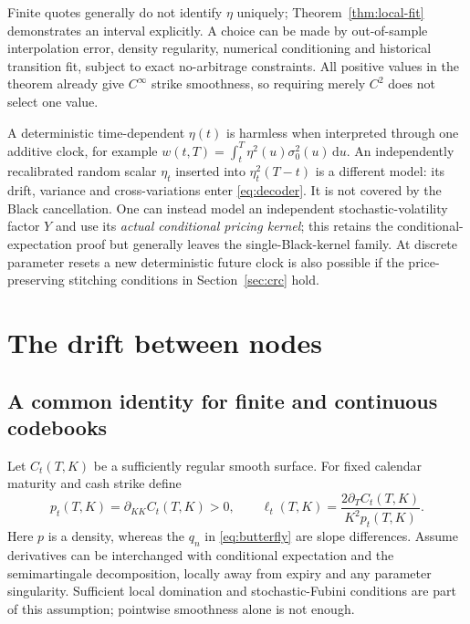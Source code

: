 \documentclass[11pt,a4paper]{article}
\numberwithin{equation}{section}
\theoremstyle{definition}\newtheorem{definition}[theorem]{Definition}
\theoremstyle{remark}\newtheorem{remark}[theorem]{Remark}
\newcommand{\dd}{\,\mathrm d}\newcommand{\dt}{\,\mathrm dt}
\begin{document}
Finite quotes generally do not identify $\eta$ uniquely; Theorem~\ref{thm:local-fit} demonstrates an interval explicitly. A choice can be made by out-of-sample interpolation error, density regularity, numerical conditioning and historical transition fit, subject to exact no-arbitrage constraints. All positive values in the theorem already give $C^\infty$ strike smoothness, so requiring merely $C^2$ does not select one value.

A deterministic time-dependent $\eta(t)$ is harmless when interpreted through one additive clock, for example $w(t,T)=\int_t^T\eta^2(u)\sigma_0^2(u)\dd u$. An independently recalibrated random scalar $\eta_t$ inserted into $\eta_t^2(T-t)$ is a different model: its drift, variance and cross-variations enter \eqref{eq:decoder}. It is not covered by the Black cancellation. One can instead model an independent stochastic-volatility factor $Y$ and use its \emph{actual conditional pricing kernel}; this retains the conditional-expectation proof but generally leaves the single-Black-kernel family. At discrete parameter resets a new deterministic future clock is also possible if the price-preserving stitching conditions in Section~\ref{sec:crc} hold.

\section{The drift between nodes}
\label{sec:continuous}
\subsection{A common identity for finite and continuous codebooks}
Let $C_t(T,K)$ be a sufficiently regular smooth surface. For fixed calendar maturity and cash strike define
\begin{equation}
 p_t(T,K)=\partial_{KK}C_t(T,K)>0,\qquad
 \ell_t(T,K)=\frac{2\partial_TC_t(T,K)}{K^2p_t(T,K)}.
 \label{eq:continuous-dlv}
\end{equation}
Here $p$ is a density, whereas the $q_n$ in \eqref{eq:butterfly} are slope differences. Assume derivatives can be interchanged with conditional expectation and the semimartingale decomposition, locally away from expiry and any parameter singularity. Sufficient local domination and stochastic-Fubini conditions are part of this assumption; pointwise smoothness alone is not enough.
\end{document}
